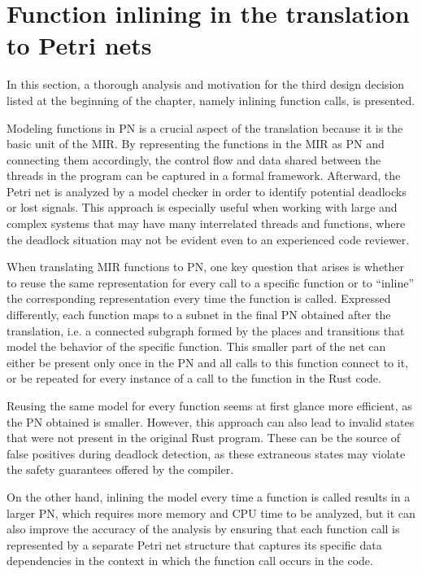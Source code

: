 \section{Function inlining in the translation to Petri nets}
\label{sec:function-inlining}

In this section, a thorough analysis and motivation for the third design decision
listed at the beginning of the chapter, namely inlining function calls, is presented.

Modeling functions in \acrshort{PN} is a crucial aspect of the translation
because it is the basic unit of the MIR.
By representing the functions in the MIR as \acrshort{PN} and connecting them accordingly,
the control flow and data shared between the threads in the program
can be captured in a formal framework.
Afterward, the Petri net is analyzed by a model checker
in order to identify potential deadlocks or lost signals.
This approach is especially useful when working with large and complex systems
that may have many interrelated threads and functions,
where the deadlock situation may not be evident even to an experienced code reviewer.

When translating MIR functions to \acrshort{PN}, one key question that arises is
whether to reuse the same representation for every call to a specific function or
to ``inline'' the corresponding representation every time the function is called.
Expressed differently, each function maps to a subnet
in the final \acrshort{PN} obtained after the translation, i.e.
a connected subgraph formed by the places and transitions
that model the behavior of the specific function.
This smaller part of the net can either be present only once in the \acrshort{PN}
and all calls to this function connect to it,
or be repeated for every instance of a call to the function in the Rust code.

Reusing the same model for every function seems at first glance more efficient,
as the \acrshort{PN} obtained is smaller.
However, this approach can also lead to invalid states
that were not present in the original Rust program.
These can be the source of false positives during deadlock detection,
as these extraneous states may violate
the safety guarantees offered by the compiler.

On the other hand, inlining the model every time a function is called results in
a larger \acrshort{PN}, which requires more memory and \acrshort{CPU} time to be analyzed,
but it can also improve the accuracy of the analysis by ensuring
that each function call is represented by a separate Petri net structure
that captures its specific data dependencies in the context
in which the function call occurs in the code.

